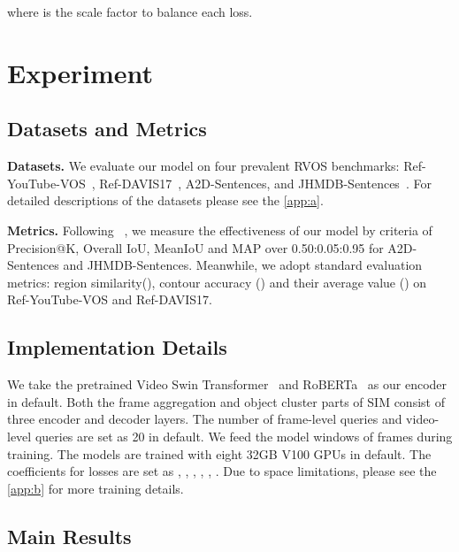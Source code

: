 \documentclass{article}
\begin{document}
where  is the scale factor to balance each loss.




\section{Experiment}
\subsection{Datasets and Metrics}
\textbf{Datasets.} We evaluate our model on four prevalent RVOS benchmarks: Ref-YouTube-VOS~\cite{urvos}, Ref-DAVIS17~\cite{davis}, A2D-Sentences, and JHMDB-Sentences~\cite{GavrilyukGLS18}. For detailed descriptions of the datasets please see the \cref{app:a}.

\vspace{-5pt}
\textbf{Metrics.}
Following ~\cite{mttr,referformer}, we measure the effectiveness of our model by criteria of Precision@K, Overall IoU, MeanIoU and MAP over 0.50:0.05:0.95 for A2D-Sentences and JHMDB-Sentences. Meanwhile, we adopt standard evaluation metrics: region similarity(), contour accuracy () and their average value () on Ref-YouTube-VOS and Ref-DAVIS17. 

\vspace{-5pt}
\subsection{Implementation Details}
We take the pretrained Video Swin Transformer~\cite{videoswin} and RoBERTa~\cite{roberta}  as our encoder in default. Both the frame aggregation and object cluster parts of SIM consist of  three encoder and decoder layers. The number of frame-level queries  and video-level queries  are set as 20 in default. 
We feed the model windows of  frames during training. 
The models are trained with eight 32GB V100 GPUs in default. The coefficients for losses are set as , , , , , . 
Due to space limitations, please see the \cref{app:b} for more training details.

\vspace{-5pt}
\subsection{Main Results}
\end{document}
